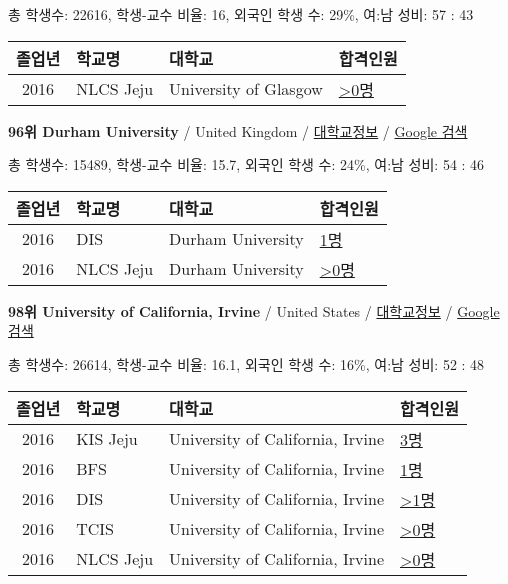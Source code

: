\documentclass[13pt,]{article}
\begin{document}
총 학생수: 22616, 학생-교수 비율: 16, 외국인 학생 수: 29\%, 여:남 성비:
57 : 43

\begin{longtable}[]{@{}clll@{}}
\toprule
졸업년 & 학교명 & 대학교 & 합격인원\tabularnewline
\midrule
\endhead
2016 & NLCS Jeju & University of Glasgow &
\href{http://cafe.naver.com/assarabia/11592}{\textgreater{}0명}\tabularnewline
\bottomrule
\end{longtable}

\textbf{96위 Durham University} / United Kingdom /
\href{https://www.timeshighereducation.com/world-university-rankings/durham-university?ranking-dataset=589595}{대학교정보}
/ \href{http://www.google.com/search?q=Durham+University}{Google 검색}

총 학생수: 15489, 학생-교수 비율: 15.7, 외국인 학생 수: 24\%, 여:남
성비: 54 : 46

\begin{longtable}[]{@{}clll@{}}
\toprule
졸업년 & 학교명 & 대학교 & 합격인원\tabularnewline
\midrule
\endhead
2016 & DIS & Durham University &
\href{http://cafe.naver.com/assarabia/11591}{1명}\tabularnewline
2016 & NLCS Jeju & Durham University &
\href{http://cafe.naver.com/assarabia/11592}{\textgreater{}0명}\tabularnewline
\bottomrule
\end{longtable}

\textbf{98위 University of California, Irvine} / United States /
\href{https://www.timeshighereducation.com/world-university-rankings/university-of-california-irvine?ranking-dataset=589595}{대학교정보}
/
\href{http://www.google.com/search?q=University+of+California,+Irvine}{Google
검색}

총 학생수: 26614, 학생-교수 비율: 16.1, 외국인 학생 수: 16\%, 여:남
성비: 52 : 48

\begin{longtable}[]{@{}clll@{}}
\toprule
졸업년 & 학교명 & 대학교 & 합격인원\tabularnewline
\midrule
\endhead
2016 & KIS Jeju & University of California, Irvine &
\href{http://cafe.naver.com/assarabia/11596}{3명}\tabularnewline
2016 & BFS & University of California, Irvine &
\href{http://cafe.naver.com/assarabia/11597}{1명}\tabularnewline
2016 & DIS & University of California, Irvine &
\href{http://cafe.naver.com/assarabia/11591}{\textgreater{}1명}\tabularnewline
2016 & TCIS & University of California, Irvine &
\href{http://cafe.naver.com/assarabia/11598}{\textgreater{}0명}\tabularnewline
2016 & NLCS Jeju & University of California, Irvine &
\href{http://cafe.naver.com/assarabia/11592}{\textgreater{}0명}\tabularnewline
\bottomrule
\end{longtable}
\end{document}
